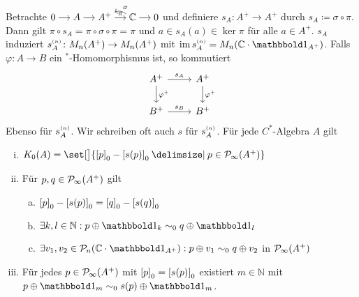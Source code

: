 \begin{definitionP}[label=prop:76]
	Betrachte \(
		\begin{tikzcd}[cramped,sep=small]
			0 \rar & A \rar & A^+ \rar["\pi"] & \mathbb{C} \lar[bend right,"\sigma"'] \rar & 0
		\end{tikzcd}
	\) und definiere $s_A \colon A^+ \to A^+$ durch $s_A \coloneqq \sigma \circ \pi$.
	Dann gilt $\pi \circ s_A = \pi \circ \sigma \circ \pi= \pi$ und $a \in s_A(a) \in \ker \pi$ für alle $a \in A^+$.
	$s_A$ induziert $s_A^\ssbrace{n} \colon M_n(A^+) \to M_n(A^+)$ mit $\im s_A^\ssbrace{n} = M_n(\mathbb{C} \cdot \ind_{A^+})$.
	Falls $\varphi \colon A \to B$ ein $^*$-Homomorphismus ist, so kommutiert 
	\[
		\begin{tikzcd}
			A^+ \rar["s_A"] \dar["\varphi^+"] & A^+ \dar["\varphi^+"] \\
			B^+ \rar["s_B"] &  B^+
		\end{tikzcd}
	\]
	Ebenso für $s_A^\ssbrace{n}$.
	Wir schreiben oft auch $s$ für $s_A^\ssbrace{n}$.
	Für jede $C^*$-Algebra $A$ gilt 
	\begin{enumerate}[(i)]
		\item $K_0(A) = \set[\big]{\benbrace*{p}_0 - \benbrace*{s(p)}_0 \given p \in \Pinfty(A^+)}$
		\item Für $p,q \in \Pinfty(A^+)$ gilt 
		\begin{enumerate}[a)]
			\item $\benbrace*{p}_0 - \benbrace*{s(p)}_0 = \benbrace*{q}_0 - \benbrace*{s(q)}_0$
			\item $\exists k,l \in \mathbb{N} : p \oplus \ind_{k} \sim_0 q \oplus \ind_l$
			\item $\exists v_1,v_2 \in \kernedP_n(\mathbb{C} \cdot \ind_{A^+}) : p \oplus v_1 \sim_0 q \oplus v_2$ in $\Pinfty(A^+)$ 
		\end{enumerate}
		\item Für jedes $p \in \Pinfty(A^+)$ mit $\benbrace*{p}_0 = \benbrace*{s(p)}_0$ existiert $m \in \mathbb{N}$ mit $p \oplus \ind_m \sim_0 s(p) \oplus \ind_m$.
	\end{enumerate}
\end{definitionP}
